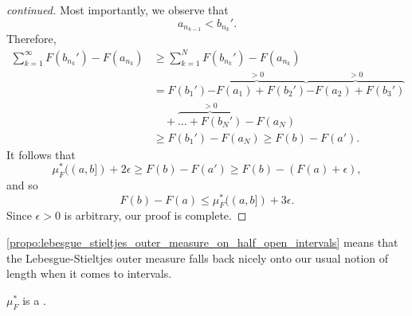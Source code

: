 \documentclass[notoc,notitlepage]{tufte-book}
\begin{document}
\begin{proof}[ continued]
  Most importantly, we observe that
  \begin{equation*}
    a_{n_{k-1}} < b_{n_k}'.
  \end{equation*}
  Therefore,
  \begin{align*}
    \sum_{k=1}^{\infty} F(b_{n_k}') - F(a_{n_k})
    &\geq \sum_{k=1}^{N} F(b_{n_k}') - F(a_{n_k}) \\
    &= F(b_1') \overbrace{- F(a_1) + F(b_2')}^{> 0}
      \overbrace{- F(a_2) + F(b_3')}^{> 0} \\
    &\quad + \overbrace{\hdots + F(b_N')}^{> 0} - F(a_N) \\
    &\geq F(b_1') - F(a_N) \geq F(b) - F(a').
  \end{align*}
  It follows that
  \begin{equation*}
    \mu_F^*((a, b]) + 2 \epsilon \geq F(b) - F(a') \geq F(b) - (F(a) + \epsilon),
  \end{equation*}
  and so
  \begin{equation*}
    F(b) - F(a) \leq \mu_F^*((a, b]) + 3\epsilon.
  \end{equation*}
  Since $\epsilon > 0$ is arbitrary, our proof is complete.
\end{proof}

\begin{remark}
  \cref{propo:lebesgue_stieltjes_outer_measure_on_half_open_intervals}
  means that the Lebesgue-Stieltjes outer measure falls back nicely
  onto our usual notion of length when it comes to intervals.
\end{remark}

\begin{propo}\label{propo:the_lebesgue_stieltjes_outer_measure_is_a_metric_outer_measure}
  $\mu_F^*$ is a .
\end{propo}
\end{document}
